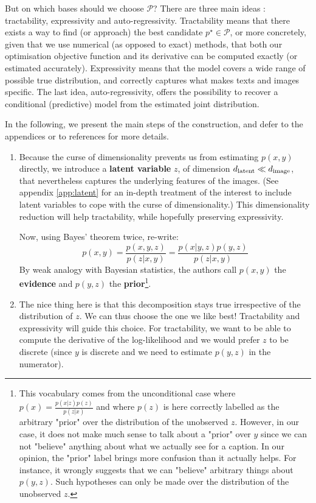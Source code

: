 \documentclass{article}
\begin{document}
\begin{multicols}{2}
But on which bases should we choose $\mathcal{P}$? There are three main ideas : tractability, expressivity and auto-regressivity. Tractability means that there exists a way to find (or approach) the best candidate $p^\star \in \mathcal{P}$, or more concretely, given that we use numerical (as opposed to exact) methods, that both our optimisation objective function and its derivative can be computed exactly (or estimated accurately). Expressivity means that the model covers a wide range of possible true distribution, and correctly captures what makes texts and images specific. The last idea, auto-regressivity, offers the possibility to recover a conditional (predictive) model from the estimated joint distribution.

In the following, we present the main steps of the construction, and defer to the appendices or to references for more details.

\begin{enumerate}

    \item Because the curse of dimensionality prevents us from estimating $p(x,y)$ directly, we introduce a \textbf{latent variable} $z$, of dimension ${d_{\mathrm{latent}}} \ll d_{\mathrm{image}}$, that nevertheless captures the underlying features of the images.
    (See appendix \ref{app:latent} for an in-depth treatment of the interest to include latent variables to cope with the curse of dimensionality.)
    This dimensionality reduction will help tractability, while hopefully preserving expressivity.
    
    Now, using Bayes' theorem twice, re-write: $$p(x,y)=\frac{p(x,y,z)}{p(z|x,y)}=\frac{p(x|y,z)p(y,z)}{p(z|x,y)}$$
    By weak analogy with Bayesian statistics, the authors call $p(x,y)$ the \textbf{evidence} and $p(y,z)$ the \textbf{prior}\footnote{
    This vocabulary comes from the unconditional case where $p(x)=\frac{p(x|z)p(z)}{p(z|x)}$ and where $p(z)$ is here correctly labelled as the arbitrary "prior" over the distribution of the unobserved $z$.
    However, in our case, it does not make much sense to talk about a "prior" over $y$ since we can not "believe" anything about what we actually see for a caption. In our opinion, the "prior" label brings more confusion than it actually helps. For instance, it wrongly suggests that we can "believe" arbitrary things about $p(y,z)$. Such hypotheses can only be made over the distribution of the unobserved $z$.
    }.
    
    \item The nice thing here is that this decomposition stays true irrespective of the distribution of $z$.
    We can thus choose the one we like best!
    Tractability and expressivity will guide this choice. For tractability, we want to be able to compute the derivative of the log-likelihood and we would prefer $z$ to be discrete (since $y$ is discrete and we need to estimate $p(y,z)$ in the numerator).
    

\end{enumerate}
\end{multicols}
\end{document}
